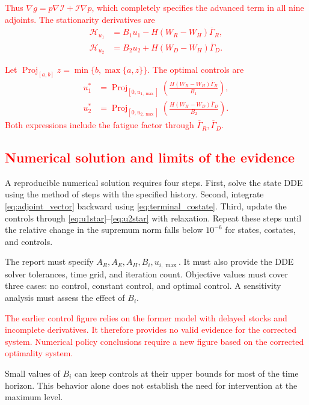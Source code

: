\documentclass[letterpaper,journal]{IEEEtran}
\begin{document}
	\textcolor{red}{
	Thus $\nabla g=p\nabla\mathcal I+\mathcal I\nabla p$, which completely specifies the advanced term in all nine adjoints.
	}
	\textcolor{red}{
	The stationarity derivatives are}
	\textcolor{red}{
	\begin{align*}
	\mathscr H_{u_1}&=B_1u_1-H(W_R-W_H)\overline\Gamma_R,\\
	\mathscr H_{u_2}&=B_2u_2+H(W_D-W_H)\overline\Gamma_D.
	\end{align*}}
	
	\textcolor{red}{Let $\operatorname{Proj}_{[a,b]}z=\min\{b,\max\{a,z\}\}$. The optimal controls are}
	\textcolor{red}{
	\begin{align}
	u_1^*&=\operatorname{Proj}_{[0,u_{1,\max}]}
	\left(\frac{H(W_R-W_H)\overline\Gamma_R}{B_1}\right),\label{eq:u1star}\\
	u_2^*&=\operatorname{Proj}_{[0,u_{2,\max}]}
	\left(\frac{H(W_H-W_D)\overline\Gamma_D}{B_2}\right).
	\label{eq:u2star}
	\end{align}}
	\textcolor{red}{Both expressions include the fatigue factor through $\overline\Gamma_R,\overline\Gamma_D$.}

	\subsection{\textcolor{red}{Numerical solution and limits of the evidence}}

A reproducible numerical solution requires four steps. First, solve the state DDE using the method of steps with the specified history. Second, integrate \eqref{eq:adjoint_vector} backward using \eqref{eq:terminal_costate}. Third, update the controls through \eqref{eq:u1star}--\eqref{eq:u2star} with relaxation. Repeat these steps until the relative change in the supremum norm falls below $10^{-6}$ for states, costates, and controls.

The report must specify $A_R,A_E,A_H,B_i,u_{i,\max}$. It must also provide the DDE solver tolerances, time grid, and iteration count. Objective values must cover three cases: no control, constant control, and optimal control. A sensitivity analysis must assess the effect of $B_i$.

\textcolor{red}{
The earlier control figure relies on the former model with delayed stocks and incomplete derivatives. It therefore provides no valid evidence for the corrected system. Numerical policy conclusions require a new figure based on the corrected optimality system.
}

Small values of $B_i$ can keep controls at their upper bounds for most of the time horizon. This behavior alone does not establish the need for intervention at the maximum level.
\end{document}
